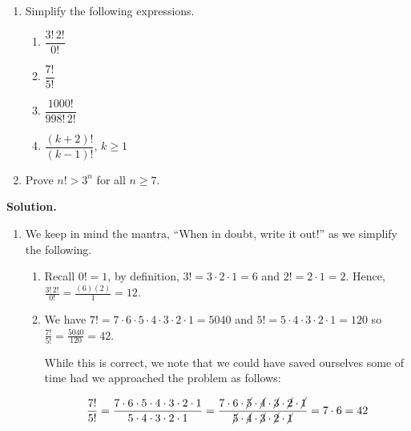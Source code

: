 \begin{ex}  \label{factorialex}  $~$

\begin{enumerate} 

\item  Simplify the following expressions.

\begin{multicols}{4}

\begin{enumerate}

\item  $\dfrac{3! \, 2!}{0!}$

\item  $\dfrac{7!}{5!}$

\item  $\dfrac{1000!}{998! \, 2!}$

\item  $\dfrac{(k+2)!}{(k-1)!}$, $k \geq 1$

\end{enumerate}

\end{multicols}

\item  Prove $n! > 3^n$ for all $n \geq 7$.

\end{enumerate}

{\bf Solution.}  

\begin{enumerate}

\item  We keep in mind the mantra, ``When in doubt, write it out!'' as we simplify the following.

\begin{enumerate}

\item  Recall $0! = 1$, by definition,  $3! = 3 \cdot 2 \cdot 1 = 6$ and $2! = 2 \cdot 1 = 2$. Hence, $\frac{3! \, 2!}{0!} = \frac{(6)(2)}{1} = 12$.

\item We have $7! = 7 \cdot 6 \cdot 5 \cdot 4 \cdot 3 \cdot 2 \cdot 1 = 5040$ and $5! = 5 \cdot 4 \cdot 3 \cdot 2 \cdot 1 = 120$ so $\frac{7!}{5!} = \frac{5040}{120} = 42$. 

\smallskip

While this is correct, we note that we could have saved ourselves some of time had we approached the problem as follows:

\[ \dfrac{7!}{5!} = \dfrac{7 \cdot 6 \cdot 5 \cdot 4 \cdot 3 \cdot 2 \cdot 1}{5 \cdot 4 \cdot 3 \cdot 2 \cdot 1} = \dfrac{7 \cdot 6 \cdot \cancel{5} \cdot \cancel{4} \cdot \cancel{3} \cdot \cancel{2} \cdot \cancel{1}}{\cancel{5} \cdot \cancel{4} \cdot \cancel{3} \cdot \cancel{2} \cdot \cancel{1}} = 7 \cdot 6 = 42\]


\end{enumerate}
\end{enumerate}
\end{ex}
